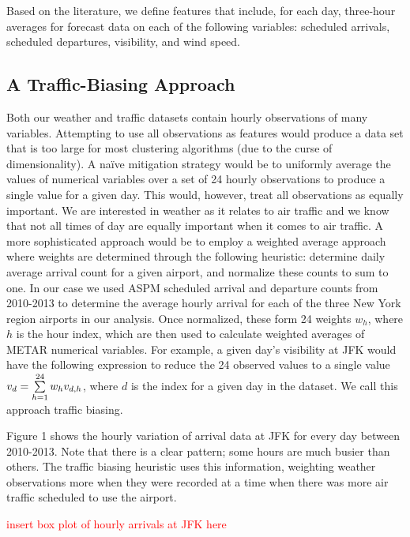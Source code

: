 \documentclass[11pt]{scrartcl}
\begin{document}
Based on the literature, we define features that include, for each day, three-hour averages for forecast data on each of the following variables: scheduled arrivals, scheduled departures, visibility, and wind speed.
 
\subsection{A Traffic-Biasing Approach}
Both our weather and traffic datasets contain hourly observations of many variables. Attempting to use all observations as features would produce a data set that is too large for most clustering algorithms (due to the curse of dimensionality).  A na{\"i}ve mitigation strategy would be to uniformly average the values of numerical variables over a set of 24 hourly observations to produce a single value for a given day.  This would, however, treat all observations as equally important.  We are interested in weather as it relates to air traffic and we know that not all times of day are equally important when it comes to air traffic.  A more sophisticated approach would be to employ a weighted average approach where weights are determined through the following heuristic: determine daily average arrival count for a given airport, and normalize these counts to sum to one.  In our case we used ASPM scheduled arrival and departure counts from 2010-2013 to determine the average hourly arrival for each of the three New York region airports in our analysis.  Once normalized, these form 24 weights $w_h$, where $h$ is the hour index, which are then used to calculate weighted averages of METAR numerical variables.  For example, a given day's visibility at JFK would have the following expression to reduce the 24 observed values to a single value $v_{d} = \sum_{h=1}^{24}\limits w_h v_{d,h}$, where $d$ is the index for a given day in the dataset.  We call this approach traffic biasing.

Figure 1 shows the hourly variation of arrival data at JFK for every day between 2010-2013.  Note that there is a clear pattern; some hours are much busier than others.  The traffic biasing heuristic uses this information, weighting weather observations more when they were recorded at a time when there was more air traffic scheduled to use the airport.
\newpage\noindent

\textcolor{red}{insert box plot of hourly arrivals at JFK here}
\end{document}

